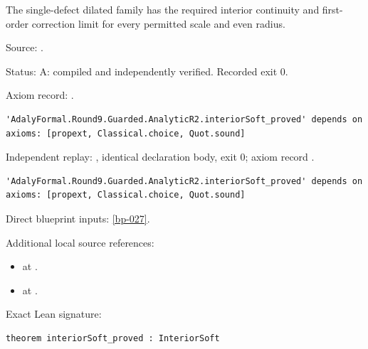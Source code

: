 \begin{theorem}[bp-096]
\label{bp-096}
\leanok
The single-defect dilated family has the required interior continuity and first-order correction limit for every permitted scale and even radius.

\par Source: \texttt{}.
\par Status: A: compiled and independently verified. Recorded exit 0.
\par Axiom record: \texttt{}.
\begin{verbatim}
'AdalyFormal.Round9.Guarded.AnalyticR2.interiorSoft_proved' depends on axioms: [propext, Classical.choice, Quot.sound]
\end{verbatim}
\par Independent replay: \texttt{}, identical declaration body, exit 0; axiom record \texttt{}.
\begin{verbatim}
'AdalyFormal.Round9.Guarded.AnalyticR2.interiorSoft_proved' depends on axioms: [propext, Classical.choice, Quot.sound]
\end{verbatim}
\par Direct blueprint inputs: \ref{bp-027}.
\par Additional local source references:
\begin{itemize}
\item \texttt{} at \texttt{}.
\item \texttt{} at \texttt{}.
\end{itemize}
\par Exact Lean signature:
\begin{verbatim}
theorem interiorSoft_proved : InteriorSoft
\end{verbatim}
\end{theorem}

